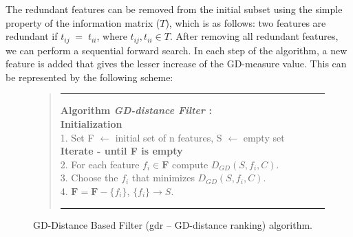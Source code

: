 \documentclass[a4paper,fleqn]{report}
\begin{document}
The redundant features can be removed from the initial subset using the simple property of the information matrix ($T$), which is as follows:
two features are redundant if $t_{ij} \;=\; t_{ii} $, where $t_{ij}, t_{ii} \in T$. After removing all redundant features, we can 
perform a sequential forward search. In each step of the algorithm, a new feature is added that gives the lesser increase 
of the GD-measure value. This can be represented by the following scheme:\\

\begin{figure}[ht] \label{jbwd:quote:gdd} %
\vspace*{-0.4cm}
\centering
\begin{quote}
\hrule width 5.6 in
\vspace{0.2cm}
{\bf Algorithm {\it GD-distance Filter} :} \\
 {\bf Initialization} \\
  1. Set F $\leftarrow$ initial set of n features, S $\leftarrow$ empty set \\
 {\bf Iterate - until F is empty}\\
  2. For each feature $f_i \in \mathbf{F} $ compute $ D_{GD} \left( S, f_i , C \right) $.\\
  3. Choose the $f_i$ that minimizes $ D_{GD} \left( S, f_i , C \right) $.\\
  4. $\mathbf{F} = \mathbf{F} - \{f_i\} $, $\{f_i\} \rightarrow S $.\\
  \vspace{0.2cm}
  \hrule width 5.6 in
 \end{quote}
\caption{ GD-Distance Based Filter (gdr -- GD-distance ranking) algorithm.}
\end{figure}

\end{document}
